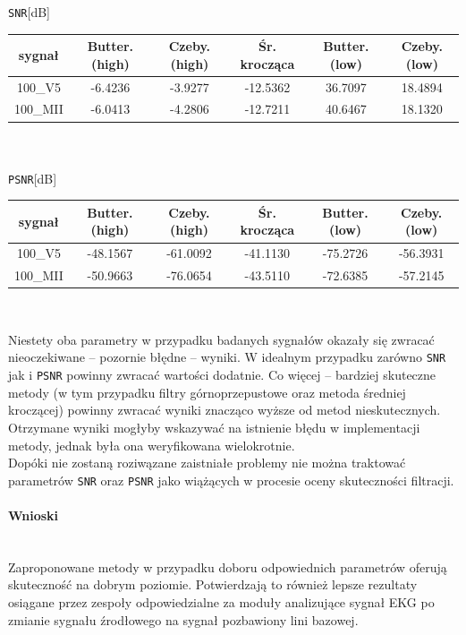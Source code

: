 \documentclass[a4paper, 11pt]{article}
\begin{document}
\begin{center}
\verb|SNR|[dB]\\ 

\begin{tabular}{|c|c|c|c|c|c|}
\hline
sygnał & Butter. (high) & Czeby. (high) & Śr. krocząca & Butter. (low) & Czeby. (low) \\ \hline
100\_V5   & -6.4236 & -3.9277 & -12.5362  & 36.7097 &  18.4894 \\ \hline
100\_MII   & -6.0413 &  -4.2806 &  -12.7211 & 40.6467 &  18.1320 \\ \hline
\end{tabular}
\mbox{} \\
\mbox{} \\
\verb|PSNR|[dB]\\
\begin{tabular}{|c|c|c|c|c|c|}
\hline
sygnał & Butter. (high) & Czeby. (high) & Śr. krocząca & Butter. (low) & Czeby. (low) \\ \hline
100\_V5   & -48.1567 & -61.0092 & -41.1130  &  -75.2726 &  -56.3931 \\ \hline
100\_MII   &  -50.9663 &   -76.0654 &  -43.5110 &  -72.6385 &  -57.2145 \\ \hline
\end{tabular}
\mbox{} \\
\end{center}
Niestety oba parametry w przypadku badanych sygnałów okazały się zwracać nieoczekiwane  -- pozornie błędne  -- wyniki. W idealnym przypadku zarówno \verb|SNR| jak i \verb|PSNR| powinny zwracać wartości dodatnie. Co więcej  -- bardziej skuteczne metody (w tym przypadku filtry górnoprzepustowe oraz metoda średniej kroczącej) powinny zwracać wyniki znacząco wyższe od metod nieskutecznych. Otrzymane wyniki mogłyby wskazywać na istnienie błędu w implementacji metody, jednak była ona weryfikowana wielokrotnie.\\
Dopóki nie zostaną roziwązane zaistniałe problemy nie można traktować parametrów \verb|SNR| oraz \verb|PSNR| jako wiążących w procesie oceny skuteczności filtracji.

\paragraph{Wnioski}
\mbox{} \\
Zaproponowane metody w przypadku doboru odpowiednich parametrów oferują skuteczność na dobrym poziomie. Potwierdzają to również lepsze rezultaty osiągane przez zespoły odpowiedzialne za moduły analizujące sygnał EKG po zmianie sygnału źrodłowego na sygnał pozbawiony lini bazowej.\\
\end{document}
